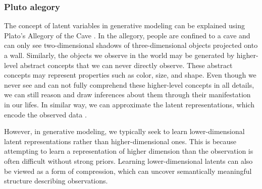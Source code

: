 \subsubsection*{Pluto alegory}
The concept of latent variables in generative modeling can be explained using Plato's Allegory of the Cave \cite{pluto-alegory}. 
In the allegory, people are confined to a cave and can only see two-dimensional shadows of three-dimensional objects projected onto a wall. 
Similarly, the objects we observe in the world may be generated by higher-level abstract concepts that we can never directly observe. 
These abstract concepts may represent properties such as color, size, and shape. Even though we never see and can not fully comprehend these 
higher-level concepts in all details, we can still reason and draw inferences about them through their manifestation in our lifes. In similar
way, we can approximate the latent representations, which encode the observed data \cite{diffusion-models-blog-2018}.  

However, in generative modeling, we typically seek to learn lower-dimensional latent representations rather than higher-dimensional ones. 
This is because attempting to learn a representation of higher dimension than the observation is often difficult without strong priors. 
Learning lower-dimensional latents can also be viewed as a form of compression, which can uncover semantically meaningful structure describing
observations.

